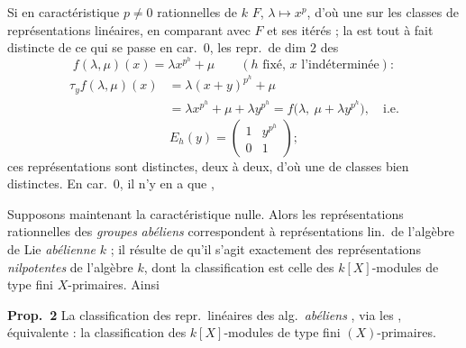 \documentclass[11pt,a4paper]{article}
\begin{document}
Si \ill{} en caractéristique $p \neq 0$ \ill{} \struck{\ill{}} rationnelles de
$k$  $F$, $\lambda \mapsto x^{p}$, \struck{\ill{}} d'où une
\ill{} sur les classes de représentations linéaires, en comparant avec $F$ et
ses itérés ; la  est tout à fait distincte de ce qui se
passe en car.\ $0$, \ill{} les repr.\ de dim $2$ \ill{} \ill{} \struck{\ill{}}
\ill{} des \ill{}
\[ f(\lambda,\mu)(x) = \lambda x^{p^{h}} + \mu \qquad
   ( h \text{ fixé, } x \text{ l'indéterminée} ) : \]
\begin{align*}
\tau_{y} f(\lambda,\mu)(x)
 &= \lambda (x+y)^{p^{h}} + \mu \\
 &= \lambda x^{p^{h}} + \mu + \lambda y^{p^{h}}
  = f\bigl(\lambda,\ \mu + \lambda y^{p^{h}}\bigr) , \quad\text{i.e.}
\end{align*}
\[ E_{h}(y) = \begin{pmatrix} 1 & y^{p^{h}} \\ 0 & 1 \end{pmatrix} ; \]
ces représentations \ill{} sont \struck{\ill{}} \ill{} distinctes, \ill{}
 deux à deux, d'où une \ill{} de classes \ill{} bien
\ill{} distinctes. En car.\ $0$, il n'y en a que , \ill{}





Supposons maintenant la caractéristique nulle. Alors les représentations
\ill{} rationnelles des \struck{\ill{}} \emph{groupes} \emph{abéliens} \ill{}
correspondent à  représentations lin.\ de l'algèbre de Lie
\emph{abélienne} $k$ ; il résulte de \ill{} qu'il s'agit exactement des
représentations \emph{nilpotentes} de l'algèbre $k$, dont la classification est
celle des $k[X]$-modules de type fini $X$-primaires. Ainsi

\textbf{Prop.\ 2} La classification des repr.\ linéaires des \ill{}
alg.\ \emph{abéliens} \ill{}, via les \ill{} \ill{}, équivalente : la
classification des $k[X]$-modules de type fini $(X)$-primaires.

\end{document}
